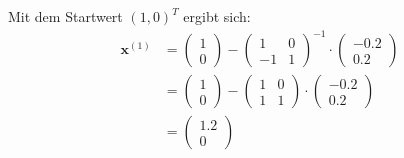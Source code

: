 \documentclass[11pt]{article}
\theoremstyle{plain}
\theoremstyle{definition}
\let\mbb\boldsymbol
\renewcommand\boldsymbol{\mbb}
\begin{document}
Mit dem Startwert $(1, 0)^T$ ergibt sich:
\begin{align*}
\mbb{x}^{(1)} &= 
\begin{pmatrix}
1 \\ 0
\end{pmatrix}
- 
\begin{pmatrix}
1 & 0 \\ -1 & 1
\end{pmatrix}
^{-1}
\cdot
\begin{pmatrix}
-0.2 \\ 0.2
\end{pmatrix} \\
&=
\begin{pmatrix}
1 \\ 0
\end{pmatrix}
- 
\begin{pmatrix}
1 & 0 \\ 1 & 1
\end{pmatrix}
\cdot
\begin{pmatrix}
-0.2 \\ 0.2
\end{pmatrix} \\
&=
\begin{pmatrix}
1.2 \\ 0
\end{pmatrix}
\end{align*}
\end{document}
